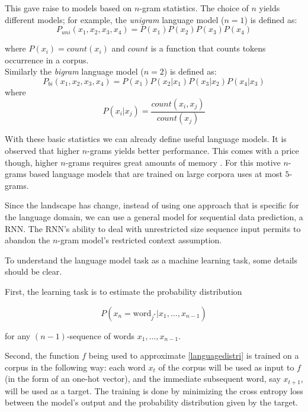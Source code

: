 This gave raise to models based on $n$-gram statistics. The choice of $n$ yields different models; for example, the 
\textit{unigram} language model ($n=1$) is defined as: 
\begin{equation}
P_{uni}(x_1, x_2, x_3, x_4) = P(x_1)P(x_2)P(x_3)P(x_4)
\end{equation}

where $P(x_i) = count(x_i)$ and $count$ is a function that counts tokens occurrence in a corpus.\\

Similarly the \textit{bigram} language model ($n=2$) is defined as: 
\begin{equation}
P_{bi}(x_1,x_2,x_3,x_4) = P(x_1)P(x_2\vert x_1)P(x_3\vert x_2)P(x_4\vert x_3)
\end{equation} 
where
\begin{equation}
P(x_i\vert x_j) = \frac{count(x_i, x_j)}{count(x_j)}
\end{equation} 

With these basic statistics we can already define useful language models. It is observed that higher $n$-grams yields better performance. This comes with a price though, higher $n$-grams requires great amounts of memory \cite{Heafield}. For this motive $n$-grams based language models that are trained on large corpora uses at most $5$-grams. 

Since \cite{Mikolov11} the landscape has change, instead of using one approach that is specific for the language domain, we can use a general model for sequential data prediction, a RNN. The RNN's ability to deal with unrestricted size sequence input permits to abandon the $n$-gram model's restricted context assumption.

To understand the language model task as a machine learning task, some details should be clear. 

First, the learning task is to estimate the probability distribution 

\begin{equation}
\label{languagedistri}
P(x_{n} = \text{word}_{j^{*}} | x_{1}, \dots ,x_{n-1})
\end{equation}

for any $(n-1)$-sequence of words $x_{1}, \dots ,x_{n-1}$.


Second, the function $f$ being used to approximate \ref{languagedistri} is trained on a corpus in the following way: each word $x_t$ of the corpus will be used as input to $f$ (in the form of an one-hot vector), and the immediate subsequent word, say $x_{t+1}$, will be used as a target. The training is done by minimizing the cross entropy loss between the model's output and the probability distribution given by the target.

